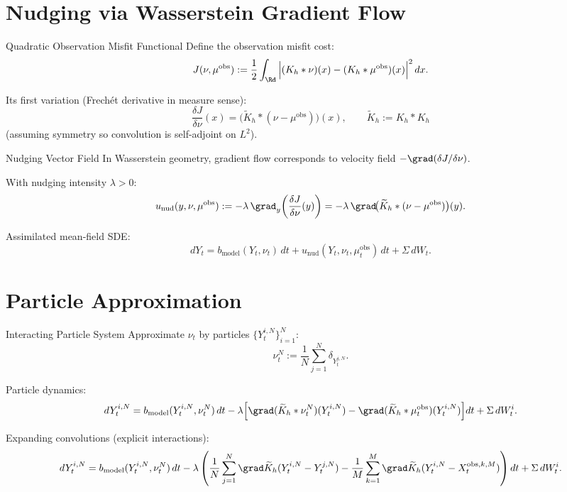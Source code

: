\documentclass[aspectratio=169]{beamer}
\begin{document}
\section{Nudging via Wasserstein Gradient Flow}

\begin{frame}{Quadratic Observation Misfit Functional}
Define the observation misfit cost:
\[
J(\nu,\mu^{\text{obs}}) :=
\frac12 \int_{\Rd} \Big|(K_h*\nu)(x)-(K_h*\mu^{\text{obs}})(x)\Big|^2\,dx.
\]

\medskip
Its first variation (Frech\'et derivative in measure sense):
\[
\frac{\delta J}{\delta \nu}(x)
= \big(\widetilde K_h * (\nu-\mu^{\text{obs}})\big)(x),
\qquad \widetilde K_h := K_h * K_h
\]
(assuming symmetry so convolution is self-adjoint on $L^2$).
\end{frame}

\begin{frame}{Nudging Vector Field}
In Wasserstein geometry, gradient flow corresponds to velocity field
$-\grad (\delta J/\delta \nu)$.

\medskip
With nudging intensity $\lambda>0$:
\[
u_{\text{nud}}(y,\nu,\mu^{\text{obs}})
:= -\lambda\,\grad_y\!\left(\frac{\delta J}{\delta \nu}(y)\right)
= -\lambda\,\grad\!\big(\widetilde K_h * (\nu-\mu^{\text{obs}})\big)(y).
\]

\medskip
Assimilated mean-field SDE:
\[
dY_t = b_{\text{model}}(Y_t,\nu_t)\,dt
+ u_{\text{nud}}(Y_t,\nu_t,\mu^{\text{obs}}_t)\,dt
+ \Sigma\, dW_t.
\]
\end{frame}

\section{Particle Approximation}

\begin{frame}{Interacting Particle System}
Approximate $\nu_t$ by particles $\{Y_t^{i,N}\}_{i=1}^N$:
\[
\nu_t^N := \frac1N\sum_{j=1}^N \delta_{Y_t^{j,N}}.
\]

\medskip
Particle dynamics:
\[
dY_t^{i,N} =
b_{\text{model}}(Y_t^{i,N},\nu_t^N)\,dt
-\lambda\Big[
\grad(\widetilde K_h*\nu_t^N)(Y_t^{i,N})
-\grad(\widetilde K_h*\mu_t^{\text{obs}})(Y_t^{i,N})
\Big]dt
+ \Sigma\, dW_t^i.
\]

\medskip
Expanding convolutions (explicit interactions):
\[
dY_t^{i,N} =
b_{\text{model}}(Y_t^{i,N},\nu_t^N)\,dt
-\lambda\left(
\frac1N\sum_{j=1}^N \grad \widetilde K_h(Y_t^{i,N}-Y_t^{j,N})
-\frac1M\sum_{k=1}^M \grad \widetilde K_h(Y_t^{i,N}-X_t^{\text{obs},k,M})
\right)dt
+\Sigma\, dW_t^i.
\]
\end{frame}
\end{document}

